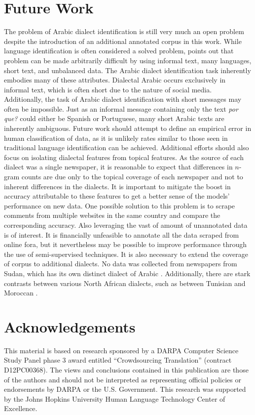 \documentclass[10pt, a4paper]{article}
\begin{document}
\section{Future Work} The problem of Arabic dialect identification is
still very much an open problem despite the introduction of an
additional annotated corpus in this work. While language identification is often
considered a solved problem,  points out
that problem can be made arbitrarily difficult by using informal text,
many languages, short text, and unbalanced data. The Arabic dialect
identification
task inherently embodies many of these attributes. Dialectal Arabic
occurs exclusively in informal text, which is often short due to the
nature of social media. Additionally, the task of Arabic dialect
identification with short messages may often be impossible. Just as an
informal message containing only the text \textit{por que?} could
either be Spanish or Portuguese, many short Arabic texts are
inherently ambiguous. Future work should attempt to define an
empirical error in human classification of data, as it is unlikely
rates similar to those seen in traditional language identification can be achieved. 
Additional efforts should also focus on isolating dialectal features from topical
features. As the source of each dialect was a single newspaper, it is
reasonable to expect that differences in $n$-gram counts are due only to
the topical coverage of each newspaper and not to inherent
differences in the dialects. It is important to mitigate the boost in accuracy attributable
to these features to get a better sense of the models' performance on
new data. One possible solution to this problem is to scrape comments
from multiple websites in the same country and compare the
corresponding accuracy. Also leveraging the vast of amount of
unannotated data is of interest. It is financially unfeasible to
annotate all the data scraped from online fora, but it nevertheless
may be possible to improve performance through the use of
semi-supervised techniques. It is also necessary to extend the
coverage of corpus to additional dialects. No data was collected from
newspapers from Sudan, which has its own distinct dialect of Arabic
\cite{comrie2013major}. Additionally, there are stark contrasts
between various North African dialects, such as between Tunisian and
Moroccan \cite{comrie2013major}.

\section*{Acknowledgements}
This material is based on research sponsored by a DARPA Computer Science Study Panel phase 3 award entitled ``Crowdsourcing Translation'' (contract D12PC00368). The views and conclusions contained in this publication are those of the authors and should not be interpreted as representing official policies or endorsements by DARPA or the U.S. Government. This research was supported by the Johns Hopkins University Human Language Technology Center of Excellence.


\nocite{*}


\end{document}
